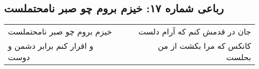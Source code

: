 \begin{center}
\section*{رباعی شماره ۱۷: خیزم بروم چو صبر نامحتملست}
\label{sec:017}
\begin{longtable}{l p{0.5cm} r}
خیزم بروم چو صبر نامحتملست
&&
جان در قدمش کنم که آرام دلست
\\
و اقرار کنم برابر دشمن و دوست
&&
کانکس که مرا بکشت از من بحلست
\\
\end{longtable}
\end{center}
